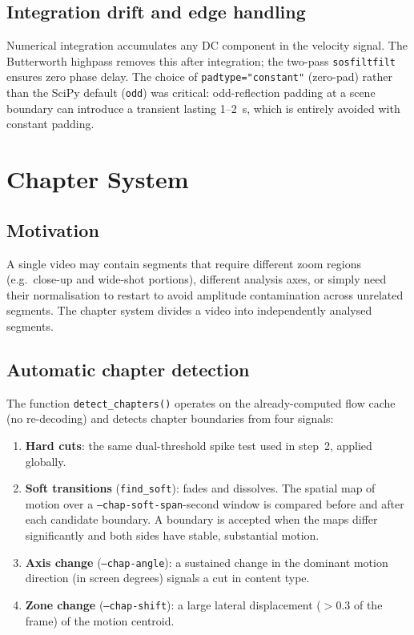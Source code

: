 \documentclass[12pt,a4paper]{article}
\begin{document}
\subsection{Integration drift and edge handling}

Numerical integration accumulates any DC component in the velocity signal. The
Butterworth highpass removes this after integration; the two-pass
\texttt{sosfiltfilt} ensures zero phase delay. The choice of
\texttt{padtype="constant"} (zero-pad) rather than the SciPy default
(\texttt{odd}) was critical: odd-reflection padding at a scene boundary can
introduce a transient lasting 1--2~s, which is entirely avoided with
constant padding.

\section{Chapter System}
\label{sec:chapters}

\subsection{Motivation}

A single video may contain segments that require different zoom regions (e.g.\
close-up and wide-shot portions), different analysis axes, or simply need their
normalisation to restart to avoid amplitude contamination across unrelated
segments. The chapter system divides a video into independently analysed
segments.

\subsection{Automatic chapter detection}

The function \texttt{detect\_chapters()} operates on the already-computed flow
cache (no re-decoding) and detects chapter boundaries from four signals:

\begin{enumerate}[nosep]
  \item \textbf{Hard cuts}: the same dual-threshold spike test used in
    step~2, applied globally.
  \item \textbf{Soft transitions} (\texttt{find\_soft}): fades and dissolves.
    The spatial map of motion over a \texttt{--chap-soft-span}-second window
    is compared before and after each candidate boundary. A boundary is
    accepted when the maps differ significantly and both sides have stable,
    substantial motion.
  \item \textbf{Axis change} (\texttt{--chap-angle}): a sustained change in
    the dominant motion direction (in screen degrees) signals a cut in content
    type.
  \item \textbf{Zone change} (\texttt{--chap-shift}): a large lateral
    displacement ($> 0.3$ of the frame) of the motion centroid.
\end{enumerate}
\end{document}
